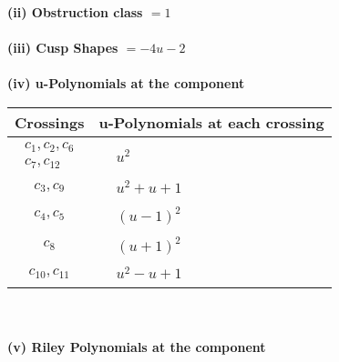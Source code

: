 \documentclass[1p]{elsarticle_modified}
\theoremstyle{definition}
\begin{document}
\flushleft \textbf{(ii) Obstruction class $= 1$}\\~\\
\flushleft \textbf{(iii) Cusp Shapes $= -4 u-2$}\\~\\
\newpage\renewcommand{\arraystretch}{1}
\flushleft \textbf{(iv) u-Polynomials at the component}\newline \\
\begin{tabular}{m{50pt}|m{274pt}}
Crossings & \hspace{64pt}u-Polynomials at each crossing \\
\hline $$\begin{aligned}c_{1},c_{2},c_{6}\\c_{7},c_{12}\end{aligned}$$&$\begin{aligned}
&u^2
\end{aligned}$\\
\hline $$\begin{aligned}c_{3},c_{9}\end{aligned}$$&$\begin{aligned}
&u^2+u+1
\end{aligned}$\\
\hline $$\begin{aligned}c_{4},c_{5}\end{aligned}$$&$\begin{aligned}
&(u-1)^2
\end{aligned}$\\
\hline $$\begin{aligned}c_{8}\end{aligned}$$&$\begin{aligned}
&(u+1)^2
\end{aligned}$\\
\hline $$\begin{aligned}c_{10},c_{11}\end{aligned}$$&$\begin{aligned}
&u^2- u+1
\end{aligned}$\\
\hline
\end{tabular}\\~\\
\newpage\renewcommand{\arraystretch}{1}
\flushleft \textbf{(v) Riley Polynomials at the component}\newline \\
\end{document}
